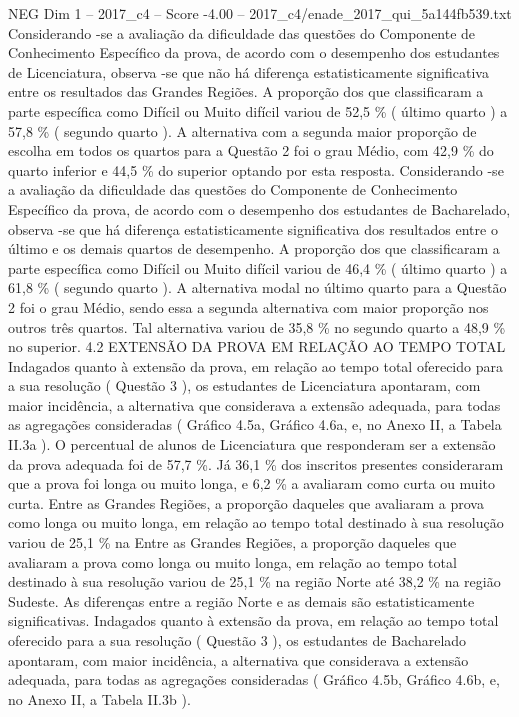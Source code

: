 \begin{textsample}{NEG Dim 1 – 2017\_c4 – Score -4.00 – 2017\_c4/enade\_2017\_qui\_5a144fb539.txt}
Considerando -se a avaliação da dificuldade das questões do Componente de Conhecimento Específico da prova, de acordo com o desempenho dos estudantes de Licenciatura, observa -se que não há diferença estatisticamente significativa entre os resultados das Grandes Regiões.
A proporção dos que classificaram a parte específica como Difícil ou Muito difícil variou de 52,5 \% ( último quarto ) a 57,8 \% ( segundo quarto ).
A alternativa com a segunda maior proporção de escolha em todos os quartos para a Questão 2 foi o grau Médio, com 42,9 \% do quarto inferior e 44,5 \% do superior optando por esta resposta.
Considerando -se a avaliação da dificuldade das questões do Componente de Conhecimento Específico da prova, de acordo com o desempenho dos estudantes de Bacharelado, observa -se que há diferença estatisticamente significativa dos resultados entre o último e os demais quartos de desempenho.
A proporção dos que classificaram a parte específica como Difícil ou Muito difícil variou de 46,4 \% ( último quarto ) a 61,8 \% ( segundo quarto ).
A alternativa modal no último quarto para a Questão 2 foi o grau Médio, sendo essa a segunda alternativa com maior proporção nos outros três quartos.
Tal alternativa variou de 35,8 \% no segundo quarto a 48,9 \% no superior. 4.2 EXTENSÃO DA PROVA EM RELAÇÃO AO TEMPO TOTAL Indagados quanto à extensão da prova, em relação ao tempo total oferecido para a sua resolução ( Questão 3 ), os estudantes de Licenciatura apontaram, com maior incidência, a alternativa que considerava a extensão adequada, para todas as agregações consideradas ( Gráfico 4.5a, Gráfico 4.6a, e, no Anexo II, a Tabela II.3a ).
O percentual de alunos de Licenciatura que responderam ser a extensão da prova adequada foi de 57,7 \%.
Já 36,1 \% dos inscritos presentes consideraram que a prova foi longa ou muito longa, e 6,2 \% a avaliaram como curta ou muito curta.
Entre as Grandes Regiões, a proporção daqueles que avaliaram a prova como longa ou muito longa, em relação ao tempo total destinado à sua resolução variou de 25,1 \% na Entre as Grandes Regiões, a proporção daqueles que avaliaram a prova como longa ou muito longa, em relação ao tempo total destinado à sua resolução variou de 25,1 \% na região Norte até 38,2 \% na região Sudeste.
As diferenças entre a região Norte e as demais são estatisticamente significativas.
Indagados quanto à extensão da prova, em relação ao tempo total oferecido para a sua resolução ( Questão 3 ), os estudantes de Bacharelado apontaram, com maior incidência, a alternativa que considerava a extensão adequada, para todas as agregações consideradas ( Gráfico 4.5b, Gráfico 4.6b, e, no Anexo II, a Tabela II.3b ).

\end{textsample}
